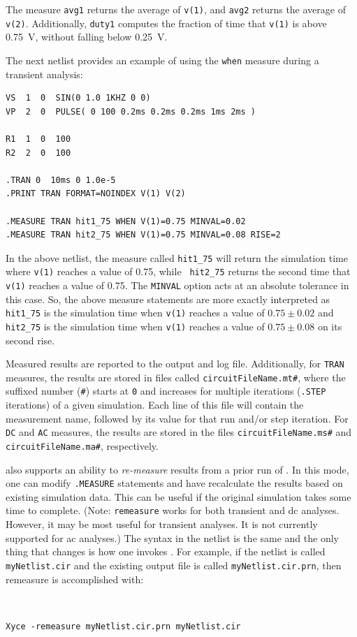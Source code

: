 The measure \texttt{avg1} returns the average of \texttt{v(1)}, and
\texttt{avg2} returns the average of \texttt{v(2)}. Additionally,
\texttt{duty1} computes the fraction of time that \texttt{v(1)} is above
0.75~V, without falling below 0.25~V. 

The next netlist provides an example of using the \texttt{when} measure
during a transient analysis:

\begin{verbatim}
VS  1  0  SIN(0 1.0 1KHZ 0 0)
VP  2  0  PULSE( 0 100 0.2ms 0.2ms 0.2ms 1ms 2ms )

R1  1  0  100
R2  2  0  100

.TRAN 0  10ms 0 1.0e-5
.PRINT TRAN FORMAT=NOINDEX V(1) V(2) 

.MEASURE TRAN hit1_75 WHEN V(1)=0.75 MINVAL=0.02
.MEASURE TRAN hit2_75 WHEN V(1)=0.75 MINVAL=0.08 RISE=2

\end{verbatim}

In the above netlist, the measure called \texttt{hit1\_75} will return the
simulation time where \texttt{v(1)} reaches a value of 0.75, while {\tt
hit2\_75} returns the second time that \texttt{v(1)} reaches a value of 0.75.
The \texttt{MINVAL} option acts at an absolute tolerance in this case. So, the
above measure statements are more exactly interpreted as \texttt{hit1\_75} is
the simulation time when \texttt{v(1)} reaches a value of $0.75 \pm 0.02$ and
\texttt{hit2\_75} is the simulation time when {\tt v(1)} reaches a value of
$0.75 \pm 0.08$ on its second rise.

Measured results are reported to the output and log file.  Additionally, for \texttt{TRAN}
measures, the results are stored in files called \texttt{circuitFileName.mt\#}, where
the suffixed number (\texttt{\#}) starts at \texttt{0} and increases for multiple
iterations (\texttt{.STEP} iterations) of a given simulation. Each line of this file
will contain the measurement name, followed by its value for that run and/or step 
iteration.  For \texttt{DC} and \texttt{AC} measures, the results are stored in the files 
\texttt{circuitFileName.ms\#} and \texttt{circuitFileName.ma\#}, respectively.

\Xyce{} also supports an ability to {\it re-measure} results from a prior run of \Xyce{}.
In this mode, one can modify \texttt{.MEASURE} statements and have \Xyce{} recalculate 
the results based on existing simulation data.  This can be useful if the original simulation 
takes some time to complete.  (Note: \texttt{remeasure} works for both transient and 
dc analyses.  However, it may be most useful for transient analyses.  It is not currently
supported for ac analyses.)  The syntax in the netlist is the same and the only thing that
changes is how one invokes \Xyce{}.  For example, if the netlist is called {\tt myNetlist.cir}
and the existing output file is called {\tt myNetlist.cir.prn}, then remeasure is accomplished with:
{\tt
\begin{verbatim}
Xyce -remeasure myNetlist.cir.prn myNetlist.cir
\end{verbatim}
}

